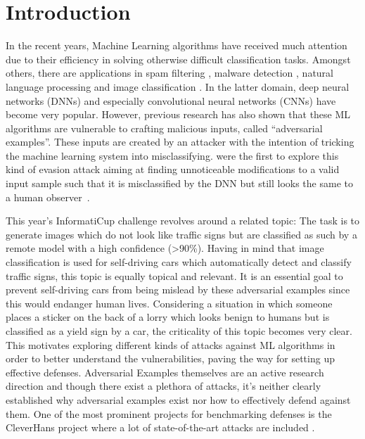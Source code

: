 \section{Introduction}
In the recent years, Machine Learning algorithms have received much attention due to their efficiency in solving otherwise difficult classification tasks.
Amongst others, there are applications in spam filtering \cite{ruan2010three, clark2003neural}, malware detection \cite{dahl2013large}, natural language processing \cite{collobert2008unified} and image classification \cite{simonyan2014very, he2016deep}.
In the latter domain, deep neural networks (DNNs) and especially convolutional neural networks (CNNs) have become very popular.
However, previous research has also shown that these ML algorithms are vulnerable to crafting malicious inputs, called \enquote{adversarial examples}.
These inputs are created by an attacker with the intention of tricking the machine learning system into misclassifying.
\citeauthor{szegedy2013intriguing} were the first to explore this kind of evasion attack aiming at finding unnoticeable modifications to a valid input sample such that it is misclassified by the DNN but still looks the same to a human observer~\cite{szegedy2013intriguing}.

This year's InformatiCup challenge revolves around a related topic: The task is to generate images which do not look like traffic signs but are classified as such by a remote model with a high confidence (>90\%).
Having in mind that image classification is used for self-driving cars which automatically detect and classify traffic signs, this topic is equally topical and relevant.
It is an essential goal to prevent self-driving cars from being mislead by these adversarial examples since this would endanger human lives.
Considering a situation in which someone places a sticker on the back of a lorry which looks benign to humans but is classified as a yield sign by a car, the criticality of this topic becomes very clear.
This motivates exploring different kinds of attacks against ML algorithms in order to better understand the vulnerabilities, paving the way for setting up effective defenses.
Adversarial Examples themselves are an active research direction and though there exist a plethora of attacks, it's neither clearly established why adversarial examples exist nor how to effectively defend against them.
One of the most prominent projects for benchmarking defenses is the CleverHans project where a lot of state-of-the-art attacks are included \cite{papernot2016cleverhans}.

